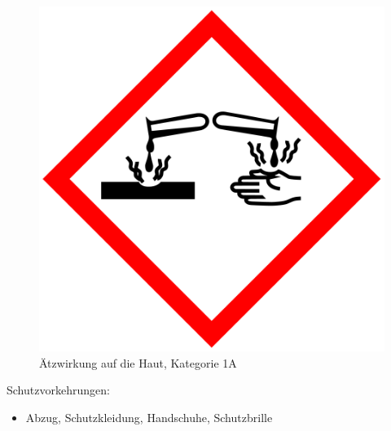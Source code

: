 \begin{figure}[h]
\begin{center}
\begin{minipage}[t]{0.4\textwidth}
\begin{center}
                \includegraphics[height=0.1\textheight]{Bilder/Optische_Datentraeger_Die_Compact_Disc/Material_Polycarbonat/cdaetzwirkung.png}
                \caption[Ätzwirkung auf die Haut, Kategorie 1A \newline \url{https://upload.wikimedia.org/wikipedia/commons/a/a1/GHS-pictogram-acid.svg} (zuletzt aufgerufen am 19.09.2015)]{Ätzwirkung auf die Haut, Kategorie 1A}
                \label{fig:cdaetzwirkung}
            \end{center}
        \end{minipage}
    \end{center}
\end{figure}

Schutzvorkehrungen:
\begin{itemize}
    \item Abzug, Schutzkleidung, Handschuhe, Schutzbrille
\end{itemize}

